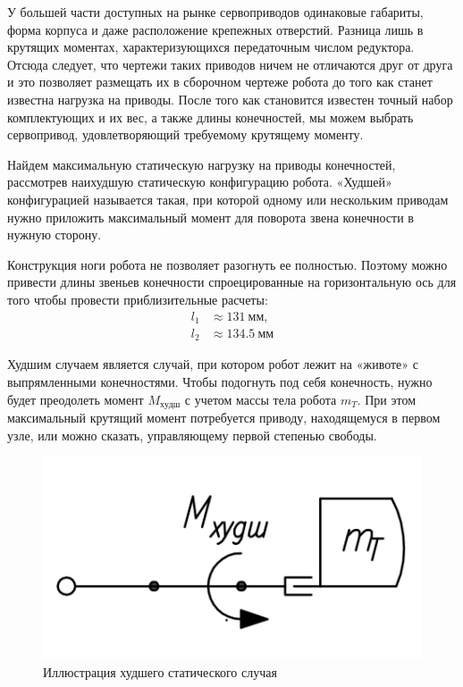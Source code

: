 У большей части доступных на рынке сервоприводов одинаковые габариты, форма корпуса и даже расположение крепежных отверстий. Разница лишь в крутящих моментах, характеризующихся передаточным числом редуктора. Отсюда следует, что чертежи таких приводов ничем не отличаются друг от друга и это позволяет размещать их в сборочном чертеже робота до того как станет известна нагрузка на приводы. После того как становится известен точный набор комплектующих и их вес, а также длины конечностей, мы можем выбрать сервопривод, удовлетворяющий требуемому крутящему моменту.

Найдем максимальную статическую нагрузку на приводы конечностей, рассмотрев наихудшую статическую конфигурацию робота. «Худшей» конфигурацией называется такая, при которой одному или нескольким приводам нужно приложить максимальный момент для поворота звена конечности в нужную сторону.

Конструкция ноги робота не позволяет разогнуть ее полностью. Поэтому можно привести длины звеньев конечности спроецированные на горизонтальную ось для того чтобы провести приблизительные расчеты:
\begin{align*}
    l_1 &\approx 131\: мм, \\
    l_2 &\approx 134.5\: мм
\end{align*}

Худшим случаем является случай, при котором робот лежит на «животе» с выпрямленными конечностями. Чтобы подогнуть под себя конечность, нужно будет преодолеть момент $M_{худш}$ с учетом массы тела робота $m_T$. При этом максимальный крутящий момент потребуется приводу, находящемуся в первом узле, или можно сказать, управляющему первой степенью свободы.

\begin{figure}[ht]
    \centering
    \includegraphics[scale=1]{kin2.png}
    \caption{Иллюстрация худшего статического случая}
\end{figure}

